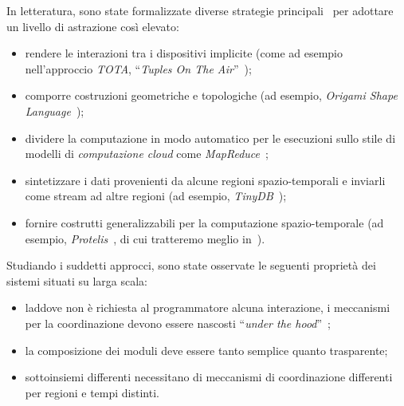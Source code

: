 
In letteratura, sono state formalizzate diverse strategie principali~\cite{7274429} per adottare un livello di astrazione così elevato:
\begin{itemize}
  \item rendere le interazioni tra i dispositivi implicite (come ad esempio nell'approccio \emph{TOTA}, ``\emph{Tuples On The Air}''~\cite{10.1145/1538942.1538945});
  \item comporre costruzioni geometriche e topologiche (ad esempio, \emph{Origami Shape Language}~\cite{nagpal2001programmable});
  \item dividere la computazione in modo automatico per le esecuzioni sullo stile di modelli di \emph{computazione cloud} come \emph{MapReduce}~\cite{10.1145/1327452.1327492};
  \item sintetizzare i dati provenienti da alcune regioni spazio-temporali e inviarli come stream ad altre regioni (ad esempio, \emph{TinyDB}~\cite{1017485});
  \item fornire costrutti generalizzabili per la computazione spazio-temporale (ad esempio, \emph{Protelis}~\cite{PianiniSASOTutorial2017}, di cui tratteremo meglio in~).
\end{itemize}

Studiando i suddetti approcci, sono state osservate le seguenti proprietà dei sistemi situati su larga scala:

\begin{itemize}
  \item laddove non è richiesta al programmatore alcuna interazione, i meccanismi per la coordinazione devono essere nascosti ``\emph{under the hood}''~\cite{7274429};
  \item la composizione dei moduli deve essere tanto semplice quanto trasparente;
  \item sottoinsiemi differenti necessitano di meccanismi di coordinazione differenti per regioni e tempi distinti.
\end{itemize}

